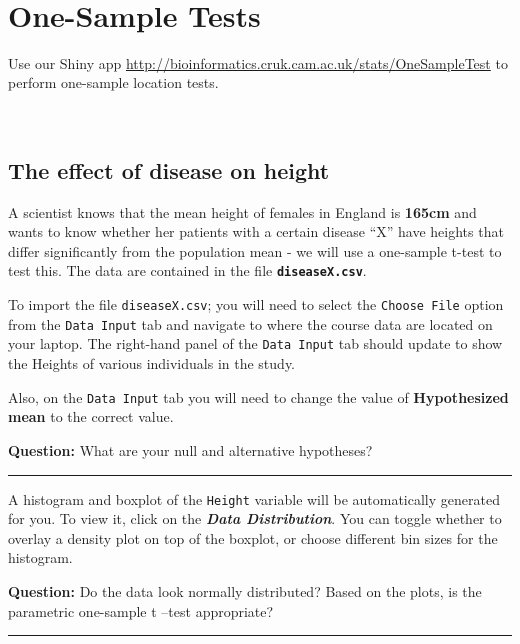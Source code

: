\documentclass[]{article}
\begin{document}
~

\hypertarget{one-sample-tests}{%
\section{One-Sample Tests}\label{one-sample-tests}}

Use our Shiny app
\url{http://bioinformatics.cruk.cam.ac.uk/stats/OneSampleTest} to
perform one-sample location tests.

~

\hypertarget{the-effect-of-disease-on-height}{%
\subsection{The effect of disease on
height}\label{the-effect-of-disease-on-height}}

A scientist knows that the mean height of females in England is
\textbf{165cm} and wants to know whether her patients with a certain
disease ``X'' have heights that differ significantly from the population
mean - we will use a one-sample t-test to test this. The data are
contained in the file \textbf{\texttt{diseaseX.csv}}.

To import the file \texttt{diseaseX.csv}; you will need to select the
\texttt{Choose\ File} option from the \texttt{Data\ Input} tab and
navigate to where the course data are located on your laptop. The
right-hand panel of the \texttt{Data\ Input} tab should update to show
the Heights of various individuals in the study.

Also, on the \texttt{Data\ Input} tab you will need to change the value
of \textbf{Hypothesized mean} to the correct value.

{\textbf{Question:}} What are your null and alternative hypotheses?

\begin{center}\rule{0.5\linewidth}{\linethickness}\end{center}

A histogram and boxplot of the \texttt{Height} variable will be
automatically generated for you. To view it, click on the
\textbf{\emph{Data Distribution}}. You can toggle whether to overlay a
density plot on top of the boxplot, or choose different bin sizes for
the histogram.

{\textbf{Question:}} Do the data look normally distributed? Based on the
plots, is the parametric one-sample t --test appropriate?

\begin{center}\rule{0.5\linewidth}{\linethickness}\end{center}
\end{document}
